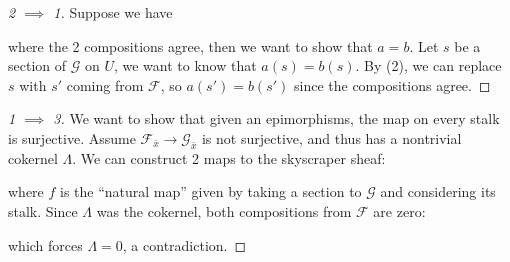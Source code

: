\begin{proof}[2 $\implies$ 1]

Suppose we have

\begin{center}
\end{center}

where the 2 compositions agree, then we want to show that \(a=b\). Let
\(s\) be a section of \(\mathcal{G}\) on \(U\), we want to know that
\(a(s) = b(s)\). By (2), we can replace \(s\) with \(s'\) coming from
\(\mathcal{F}\), so \(a(s') = b(s')\) since the compositions agree.

\end{proof}

\begin{proof}[1 $\implies$ 3]

We want to show that given an epimorphisms, the map on every stalk is
surjective. Assume \(\mathcal{F}_{\bar x} \to \mathcal{G}_{\bar x}\) is
not surjective, and thus has a nontrivial cokernel \(\Lambda\). We can
construct 2 maps to the skyscraper sheaf:

\begin{center}
\end{center}

where \(f\) is the ``natural map'' given by taking a section to
\(\mathcal{G}\) and considering its stalk. Since \(\Lambda\) was the
cokernel, both compositions from \(\mathcal{F}\) are zero:

\begin{center}
\end{center}

which forces \(\Lambda = 0\), a contradiction.

\end{proof}


